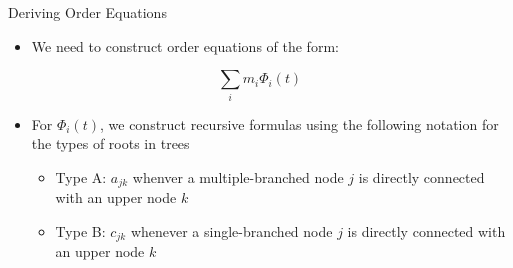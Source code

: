 \documentclass[serif]{beamer}
\begin{document}
\begin{frame}{Deriving Order Equations}
  \begin{itemize}
  \item<1-> We need to construct order equations of the form:
  \end{itemize}

  \begin{equation}
    \nonumber
    \sum_im_i\Phi_i\left(t\right)
  \end{equation}
  \begin{itemize}
  \item<1-> For $\Phi_i\left(t\right)$, we construct recursive formulas using the following notation for the types of roots in trees
      \begin{itemize}
      \item<1-> Type A: $a_{jk}$ whenver a multiple-branched node $j$ is directly connected with an upper node $k$
      \item<1-> Type B: $c_{jk}$ whenever a single-branched node $j$ is directly connected with an upper node $k$
      \end{itemize}
  \end{itemize}
  \begin{center}
  \end{center}
\end{frame}
\end{document}
